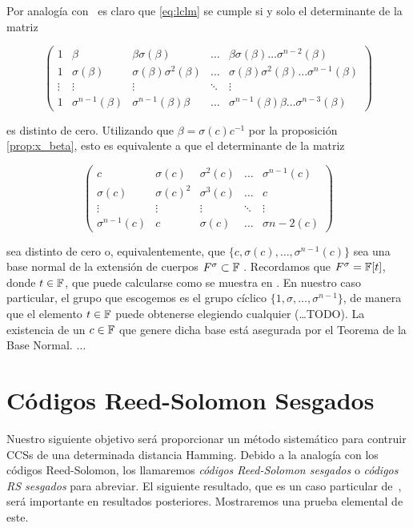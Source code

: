 Por analogía con~\cite[Proposición 1]{SCC_boucher} es claro que
\ref{eq:lclm} se cumple si y solo el determinante de la matriz

\[
\begin{pmatrix}
    1 & \beta & \beta\sigma(\beta) & \dots & \beta\sigma(\beta)\dots\sigma^{n-2}(\beta) \\
    1 & \sigma(\beta) & \sigma(\beta)\sigma^2(\beta) & \dots & \sigma(\beta)\sigma^2(\beta)\dots\sigma^{n-1}(\beta) \\
    \vdots & \vdots & \vdots & \ddots & \vdots \\
    1 & \sigma^{n-1}(\beta) & \sigma^{n-1}(\beta)\beta & \dots & \sigma^{n-1}(\beta)\beta\dots\sigma^{n-3}(\beta)

\end{pmatrix}
\]

es distinto de cero. Utilizando que \(\beta = \sigma(c)c^{-1}\) por la proposición \ref{prop:x_beta}, esto es equivalente a que el determinante de la matriz

\[
\begin{pmatrix}
    c & \sigma(c) & \sigma^2(c) & \dots & \sigma^{n-1}(c) \\
    \sigma(c) & \sigma(c)^2 & \sigma^3(c) & \dots & c \\
    \vdots & \vdots & \vdots & \ddots & \vdots \\
    \sigma^{n-1}(c) & c & \sigma(c) & \dots & \sigma{n-2}(c)
\end{pmatrix}
\]

sea distinto de cero o, equivalentemente, que \(\{c, \sigma(c), \dots, \sigma^{n-1}(c)\}\) sea una base normal de la extensión de cuerpos \(F^\sigma \subset \mathbb{F}\) \cite{turing1936a}. Recordamos que \(F^\sigma = \mathbb{F}[t]\), donde \(t \in \mathbb{F}\), que puede calcularse como se muestra en \cite{turing1936a}. En nuestro caso particular, el grupo que escogemos es el grupo cíclico \(\{1, \sigma, \dots, \sigma^{n-1}\}\), de manera que el elemento \(t \in \mathbb{F}\) puede obtenerse elegiendo cualquier  (\dots TODO). La existencia de un \(c \in \mathbb{F}\) que genere dicha base está asegurada por el Teorema de la Base Normal. \(\dots\)

\section{Códigos Reed-Solomon Sesgados}%
\label{sec:códigos_reed_solomon_sesgados}

Nuestro siguiente objetivo será proporcionar un método sistemático para contruir CCSs de una determinada distancia Hamming. Debido a la analogía con los códigos Reed-Solomon, los llamaremos \textit{códigos Reed-Solomon sesgados} o \textit{códigos RS sesgados} para abreviar. El siguiente resultado, que es un caso particular de~\cite[Corolario 4.13]{Lam_1988}, será importante en resultados posteriores. Mostraremos una prueba elemental de este.

